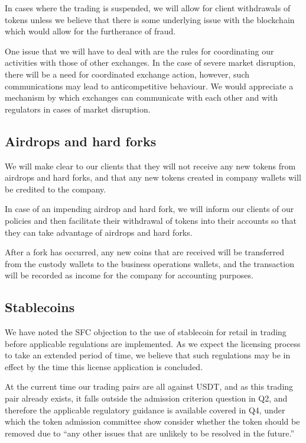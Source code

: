 In cases where the trading is suspended, we will allow for client
withdrawals of tokens unless we believe that there is some underlying
issue with the blockchain which would allow for the furtherance of
fraud.

One issue that we will have to deal with are the rules for coordinating our
activities with those of other exchanges.  In the case of severe market
disruption, there will be a need for coordinated exchange action,
however, such communications may lead to anticompetitive behaviour.  We
would appreciate a mechanism by which exchanges can communicate with
each other and with regulators in cases of market disruption.

\subsection{Airdrops and hard forks}
We will make clear to our clients that they will not receive any
new tokens from airdrops and hard forks, and that any new tokens
created in company wallets will be credited to the company.

In case of an impending airdrop and hard fork, we will inform our
clients of our policies and then facilitate their withdrawal of tokens
into their accounts so that they can take advantage of airdrops and
hard forks.

After a fork has occurred, any new coins that are received will be transferred from the custody wallets to the business operations wallets, and the transaction will be recorded as income for the company for accounting purposes.

\subsection{Stablecoins}
We have noted the SFC objection to the use of stablecoin for retail in
trading before applicable regulations are implemented.  As we expect
the licensing process to take an extended period of time, we believe
that such regulations may be in effect by the time this license
application is concluded.

At the current time our trading pairs are all against USDT, and as
this trading pair already exists, it falls outside the admission
criterion question in Q2, and therefore the applicable regulatory
guidance is available covered in Q4, under which the token admission
committee show consider whether the token should be removed due to
``any other issues that are unlikely to be resolved in the future.''

